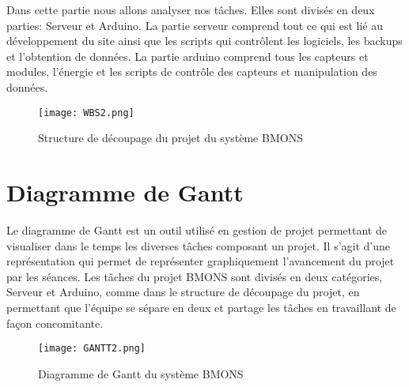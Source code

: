 Dans cette partie nous allons analyser nos tâches. Elles sont divisés en deux parties: Serveur et Arduino. La partie serveur comprend tout ce qui est lié au développement du site ainsi que les scripts qui contrôlent les logiciels, les backups et l'obtention de données. La partie arduino comprend tous les capteurs et modules, l'énergie et les scripts de contrôle des capteurs et manipulation des données.  


\begin{figure}[h!]
\centering\texttt{[image: WBS2.png]}
\caption{\label{fig:SDP} Structure de découpage du projet du système BMONS}
\end{figure}

\clearpage

\section{Diagramme de Gantt}

Le diagramme de Gantt est un outil utilisé en gestion de projet permettant de visualiser dans le temps les diverses tâches composant un projet. Il s'agit d'une représentation qui permet de représenter graphiquement l'avancement du projet par les séances. Les tâches du projet BMONS sont divisés en deux catégories, Serveur et Arduino, comme dans le structure de découpage du projet, en permettant que l'équipe se sépare en deux et partage les tâches en travaillant de façon concomitante.

\begin{figure}[h!]
\centering\texttt{[image: GANTT2.png]}
\caption{\label{fig:GANTT} Diagramme de Gantt du système BMONS}
\end{figure}


